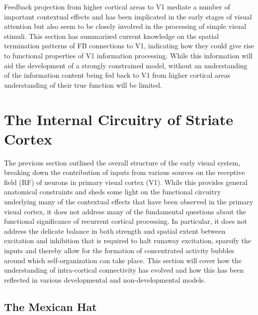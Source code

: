 Feedback projection from higher cortical areas to V1 mediate a number
of important contextual effects and has been implicated in the early
stages of visual attention but also seem to be closely involved in the
processing of simple visual stimuli. This section has summarized
current knowledge on the spatial termination patterns of FB
connections to V1, indicating how they could give rise to functional
properties of V1 information processing. While this information will
aid the development of a strongly constrained model, without an
understanding of the information content being fed back to V1 from
higher cortical areas understanding of their true function will be
limited.

\section{The Internal Circuitry of Striate Cortex}

The previous section outlined the overall structure of the early visual
system, breaking down the contribution of inputs from various sources
on the receptive field (RF) of neurons in primary visual cortex
(V1). While this provides general anatomical constraints and sheds
some light on the functional circuitry underlying many of the
contextual effects that have been observed in the primary visual
cortex, it does not address many of the fundamental questions about
the functional significance of recurrent cortical processing. In
particular, it does not address the delicate balance in both strength
and spatial extent between excitation and inhibition that is required
to halt runaway excitation, sparsify the inputs and thereby allow for
the formation of concentrated activity bubbles around which
self-organization can take place. This section will cover how the
understanding of intra-cortical connectivity has evolved and how this
has been reflected in various developmental and non-developmental
models.

\subsection{The Mexican Hat}

